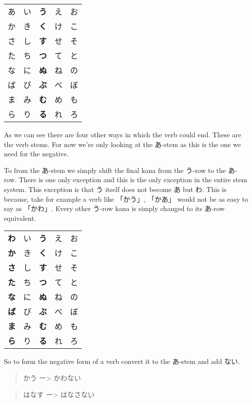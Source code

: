 \documentclass[11pt]{article}
\begin{document}
\begin{center}
\begin{tabular}{lllll}
あ & い & \textbf{う} & え & お\\
か & き & \textbf{く} & け & こ\\
さ & し & \textbf{す} & せ & そ\\
た & ち & \textbf{つ} & て & と\\
な & に & \textbf{ぬ} & ね & の\\
ば & び & \textbf{ぶ} & べ & ぼ\\
ま & み & \textbf{む} & め & も\\
ら & り & \textbf{る} & れ & ろ\\
\end{tabular}
\end{center}

As we can see there are four other ways in which the verb could end. These are the verb stems. For now we're only looking at the あ-stem as this is the one we need for the negative.

To from the あ-stem we simply shift the final kana from the う-row to the あ-row. There is one only exception and this is the only exception in the entire stem system. This exception is that う itself does not become あ but わ. This is because, take for example a verb like 「かう」, 「かあ」 would not be as easy to say as 「かわ」. Every other う-row kana is simply changed to its あ-row equivalent.
\begin{center}
\begin{tabular}{lllll}
\textbf{\textbf{わ}} & い & \textbf{う} & え & お\\
\textbf{か} & き & \textbf{く} & け & こ\\
\textbf{さ} & し & \textbf{す} & せ & そ\\
\textbf{た} & ち & \textbf{つ} & て & と\\
\textbf{な} & に & \textbf{ぬ} & ね & の\\
\textbf{ば} & び & \textbf{ぶ} & べ & ぼ\\
\textbf{ま} & み & \textbf{む} & め & も\\
\textbf{ら} & り & \textbf{る} & れ & ろ\\
\end{tabular}
\end{center}

So to form the negative form of a verb convert it to the あ-stem and add ない.
\begin{quote}
かう ー> かわない
\end{quote}
\begin{quote}
はなす ー> はなさない
\end{quote}
\end{document}
